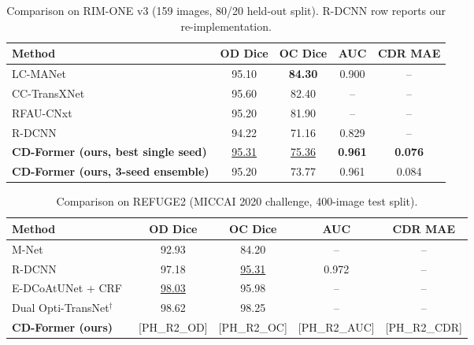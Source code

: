 \begin{table}[t]
\centering
\caption{Comparison on RIM-ONE v3 (159 images, 80/20 held-out split).
R-DCNN row reports our re-implementation.}
\label{tab:rimone}
\setlength{\tabcolsep}{8pt}
\renewcommand{\arraystretch}{1.15}
\begin{tabular}{lcccc}
\toprule
\textbf{Method} & \textbf{OD Dice} & \textbf{OC Dice} & \textbf{AUC} & \textbf{CDR MAE} \\
\midrule
LC-MANet~\cite{lcmanet2024}                     & 95.10 & \textbf{84.30} & 0.900 & --    \\
CC-TransXNet~\cite{cctransxnet2024}             & 95.60 & 82.40 & --    & --    \\
RFAU-CNxt~\cite{rfaucnxt2023}                   & 95.20 & 81.90 & --    & --    \\
R-DCNN~\cite{li2023rdcnn}                        & 94.22 & 71.16 & 0.829 & --    \\
\midrule
\rowcolor{ourrow}
\textbf{\textcolor{ourbold}{CD-Former (ours, best single seed)}} & \underline{95.31} & \underline{75.36} & \textbf{0.961} & \textbf{0.076} \\
\rowcolor{ourrow}
\textbf{\textcolor{ourbold}{CD-Former (ours, 3-seed ensemble)}} & 95.20 & 73.77 & 0.961 & 0.084 \\
\bottomrule
\end{tabular}
\end{table}


\begin{table}[t]
\centering
\caption{Comparison on REFUGE2 (MICCAI 2020 challenge, 400-image test split).}
\label{tab:refuge2}
\setlength{\tabcolsep}{8pt}
\renewcommand{\arraystretch}{1.15}
\begin{tabular}{lcccc}
\toprule
\textbf{Method} & \textbf{OD Dice} & \textbf{OC Dice} & \textbf{AUC} & \textbf{CDR MAE} \\
\midrule
M-Net~\cite{mnet2018}                                & 92.93 & 84.20 & --    & --    \\
R-DCNN~\cite{li2023rdcnn}                            & 97.18 & \underline{95.31} & 0.972 & --    \\
E-DCoAtUNet + CRF~\cite{edcoatunet2025}              & \underline{98.03} & 95.98 & --    & --    \\
Dual Opti-TransNet$^\dagger$~\cite{dualoptitrans2026} & 98.62 & 98.25 & --    & --    \\
\midrule
\rowcolor{ourrow}
\textbf{\textcolor{ourbold}{CD-Former (ours)}} & [PH\_R2\_OD] & [PH\_R2\_OC] & [PH\_R2\_AUC] & [PH\_R2\_CDR] \\
\bottomrule
\end{tabular}
\end{table}


